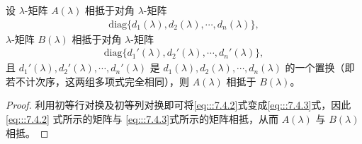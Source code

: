 \documentclass[../../main.tex]{subfiles}
\begin{document}
\begin{lemma}\label{lemma:对角元素的置换不改变相抵性}
设 $\lambda$-矩阵 $A(\lambda)$ 相抵于对角 $\lambda$-矩阵
\begin{align}
\mathrm{diag}\{d_1(\lambda),d_2(\lambda),\cdots,d_n(\lambda)\},
\label{eq:::7.4.2}
\end{align}
$\lambda$-矩阵 $B(\lambda)$ 相抵于对角 $\lambda$-矩阵
\begin{align}
\mathrm{diag}\{d_1'(\lambda),d_2'(\lambda),\cdots,d_n'(\lambda)\},
\label{eq:::7.4.3}
\end{align}
且 $d_1'(\lambda),d_2'(\lambda),\cdots,d_n'(\lambda)$ 是 $d_1(\lambda),d_2(\lambda),\cdots,d_n(\lambda)$ 的一个置换（即若不计次序，这两组多项式完全相同），则 $A(\lambda)$ 相抵于 $B(\lambda)$。
\end{lemma}
\begin{proof}
利用初等行对换及初等列对换即可将\eqref{eq:::7.4.2}式变成\eqref{eq:::7.4.3}式，因此\eqref{eq:::7.4.2} 式所示的矩阵与 \eqref{eq:::7.4.3}式所示的矩阵相抵，从而 $A(\lambda)$ 与 $B(\lambda)$ 相抵。

\end{proof}
\end{document}
